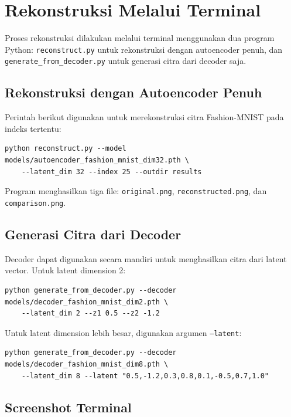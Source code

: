\documentclass[12pt,a4paper]{article}
\begin{document}
\section{Rekonstruksi Melalui Terminal}

Proses rekonstruksi dilakukan melalui terminal menggunakan dua program Python: \texttt{reconstruct.py} untuk rekonstruksi dengan autoencoder penuh, dan \texttt{generate\_from\_decoder.py} untuk generasi citra dari decoder saja.

\subsection{Rekonstruksi dengan Autoencoder Penuh}

Perintah berikut digunakan untuk merekonstruksi citra Fashion-MNIST pada indeks tertentu:

{\footnotesize\begin{verbatim}
python reconstruct.py --model models/autoencoder_fashion_mnist_dim32.pth \
    --latent_dim 32 --index 25 --outdir results
\end{verbatim}}

Program menghasilkan tiga file: \texttt{original.png}, \texttt{reconstructed.png}, dan \texttt{comparison.png}.

\subsection{Generasi Citra dari Decoder}

Decoder dapat digunakan secara mandiri untuk menghasilkan citra dari latent vector. Untuk latent dimension 2:

{\footnotesize\begin{verbatim}
python generate_from_decoder.py --decoder models/decoder_fashion_mnist_dim2.pth \
    --latent_dim 2 --z1 0.5 --z2 -1.2
\end{verbatim}}

Untuk latent dimension lebih besar, digunakan argumen \texttt{--latent}:

{\footnotesize\begin{verbatim}
python generate_from_decoder.py --decoder models/decoder_fashion_mnist_dim8.pth \
    --latent_dim 8 --latent "0.5,-1.2,0.3,0.8,0.1,-0.5,0.7,1.0"
\end{verbatim}}

\subsection{Screenshot Terminal}
\end{document}
